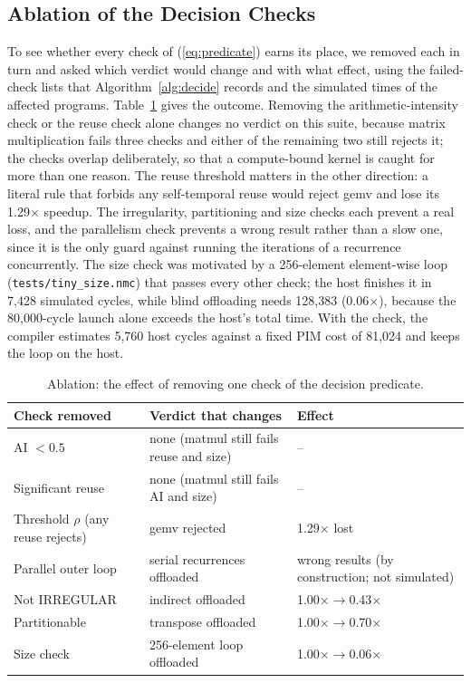 \documentclass{ieeeaccess}
\begin{document}
\subsection{Ablation of the Decision Checks}
To see whether every check of (\ref{eq:predicate}) earns its place, we removed each in turn and asked which verdict would change and with what effect, using the failed-check lists that Algorithm~\ref{alg:decide} records and the simulated times of the affected programs. Table~\ref{tab:ablation} gives the outcome. Removing the arithmetic-intensity check or the reuse check alone changes no verdict on this suite, because matrix multiplication fails three checks and either of the remaining two still rejects it; the checks overlap deliberately, so that a compute-bound kernel is caught for more than one reason. The reuse threshold matters in the other direction: a literal rule that forbids any self-temporal reuse would reject gemv and lose its 1.29$\times$ speedup. The irregularity, partitioning and size checks each prevent a real loss, and the parallelism check prevents a wrong result rather than a slow one, since it is the only guard against running the iterations of a recurrence concurrently. The size check was motivated by a 256-element element-wise loop (\texttt{tests/tiny\_size.nmc}) that passes every other check; the host finishes it in 7,428 simulated cycles, while blind offloading needs 128,383 (0.06$\times$), because the 80,000-cycle launch alone exceeds the host's total time. With the check, the compiler estimates 5,760 host cycles against a fixed PIM cost of 81,024 and keeps the loop on the host.

\begin{table}[!t]
\caption{Ablation: the effect of removing one check of the decision predicate.}
\label{tab:ablation}
\setlength{\tabcolsep}{2.5pt}
\renewcommand{\arraystretch}{1.1}
\centering
\begin{tabular}{|p{2.3cm}|p{2.6cm}|p{2.6cm}|}
\hline
\textbf{Check removed} & \textbf{Verdict that changes} & \textbf{Effect} \\ \hline
AI $<0.5$ & none (matmul still fails reuse and size) & -- \\ \hline
Significant reuse & none (matmul still fails AI and size) & -- \\ \hline
Threshold $\rho$ (any reuse rejects) & gemv rejected & 1.29$\times$ lost \\ \hline
Parallel outer loop & serial recurrences offloaded & wrong results (by construction; not simulated) \\ \hline
Not IRREGULAR & indirect offloaded & 1.00$\times\rightarrow$0.43$\times$ \\ \hline
Partitionable & transpose offloaded & 1.00$\times\rightarrow$0.70$\times$ \\ \hline
Size check & 256-element loop offloaded & 1.00$\times\rightarrow$0.06$\times$ \\ \hline
\end{tabular}
\end{table}
\end{document}
